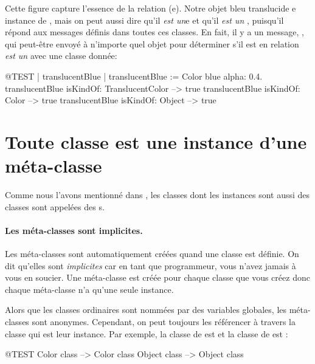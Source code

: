 \documentclass[a4paper,10pt,twoside]{book}
\begin{document}
Cette figure capture l'essence de la relation (e).
Notre objet bleu translucide e instance de , mais on peut aussi dire qu'il
\emph{est un}{}e   et qu'il \emph{est un} , puisqu'il répond aux messages définis dans toutes ces classes.
En fait, il y a un message, , qui peut-être envoyé à n'importe quel objet pour déterminer s'il est en relation \emph{est un} avec une classe donnée:

\begin{code}{@TEST | translucentBlue |}
translucentBlue := Color blue alpha: 0.4.
translucentBlue isKindOf: TranslucentColor --> true
translucentBlue isKindOf: Color                    --> true
translucentBlue isKindOf: Object                  --> true
\end{code}

\section{Toute classe est une instance d'une méta-classe}


Comme nous l'avons mentionné dans , les classes dont les instances sont aussi des classes sont appelées des s.

\paragraph{Les méta-classes sont implicites.}
Les méta-classes sont automatiquement créées quand une classe est définie.
On dit qu'elles sont \emph{implicites} car en tant que programmeur, vous n'avez jamais à vous en soucier.
Une méta-classe  est créée pour chaque classe que vous créez donc chaque méta-classe n'a qu'une seule instance.

Alors que les classes ordinaires sont nommées par des variables globales, les méta-classes sont anonymes.
Cependant, on peut toujours les référencer à travers la classe qui est leur instance.
Par exemple, la classe de  est  et la classe de  est :
\begin{code}{@TEST}
Color class   --> Color class
Object class --> Object class
\end{code}
\end{document}
